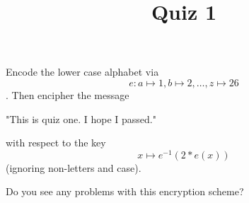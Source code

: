 \documentclass[12pt]{amsart}
\theoremstyle{definition}
\begin{document}
\title{Quiz 1}

\maketitle

Encode the lower case alphabet via $$e: a \mapsto 1, b \mapsto 2, \ldots, z \mapsto 26$$. 
Then encipher the message 
\begin{center}
	"This is quiz one. I hope I passed."
\end{center}
with respect to the key
\begin{displaymath}
	x \mapsto e^{-1}(2*e(x))
\end{displaymath}
(ignoring non-letters and case).

Do you see any problems with this encryption scheme?
\end{document}
